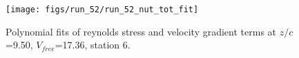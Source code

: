 \begin{figure}[H]
\centering
\texttt{[image: figs/run\_52/run\_52\_nut\_tot\_fit]}
\caption{Polynomial fits of reynolds stress and velocity gradient terms at $z/c$=9.50, $V_{free}$=17.36, station 6.}
\label{fig:run_52_nut_tot_fit}
\end{figure}


